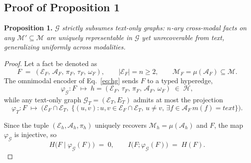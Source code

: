 \documentclass{article}
\begin{document}
\subsection{Proof of Proposition 1}\label{proof1}
\textbf{Proposition 1.} \textit{$\mathcal{G}$ strictly subsumes text-only graphs: $n$-ary cross-modal facts on any $\mathcal{M}'\!\subseteq\!\mathcal{M}$ are uniquely representable in $\mathcal{G}$ yet unrecoverable from text, generalizing uniformly across modalities.}\vspace{-2mm}
\begin{proof}
Let a fact be denoted as
\begin{equation}
F\;=\;(\mathcal{E}_F,\,\mathcal{A}_F,\,\pi_F,\,\tau_F,\,\omega_F),\qquad |\mathcal{E}_F|\!=\!n\!\geq\!2,\qquad \mathcal{M}_F\!=\!\mu(\mathcal{A}_F)\!\subseteq\!\mathcal{M}.
\label{eq:p1-fact}
\end{equation}
The omnimodal encoder of Eq.~\eqref{eq:hg} sends $F$ to a typed hyperedge,
\begin{equation}
\varphi_{\mathcal{G}}\colon F\;\longmapsto\;h\!=\!(\mathcal{E}_F,\,\tau_F,\,\pi_F,\,\mathcal{A}_F,\,\omega_F)\;\in\;\mathcal{H},
\label{eq:p1-phiG}
\end{equation}
while any text-only graph $\mathcal{G}_T\!=\!(\mathcal{E}_T,E_T)$ admits at most the projection
\begin{equation}
\varphi_T\colon F\;\longmapsto\;\bigl(\mathcal{E}_F\!\cap\!\mathcal{E}_T,\;\{(u,v)\!:\!u,v\!\in\!\mathcal{E}_F\!\cap\!\mathcal{E}_T,\,u\!\neq\!v,\,\exists f\!\in\!\mathcal{A}_F\,m(f)\!=\!\textit{text}\}\bigr).
\label{eq:p1-phiT}
\end{equation}

Since the tuple $(\mathcal{E}_h,\mathcal{A}_h,\pi_h)$ uniquely recovers $\mathcal{M}_h\!=\!\mu(\mathcal{A}_h)$ and $F$, the map $\varphi_{\mathcal{G}}$ is injective, so
\begin{equation}
H\!\bigl(F\!\mid\!\varphi_{\mathcal{G}}(F)\bigr)\;=\;0,\qquad I\!\bigl(F;\varphi_{\mathcal{G}}(F)\bigr)\;=\;H(F).
\label{eq:p1-Igamma}
\end{equation}


\end{proof}
\end{document}
